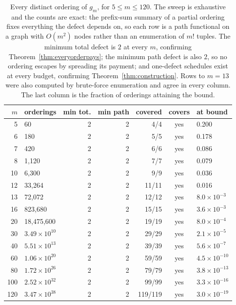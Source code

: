 \begin{table}[htbp]
\caption{Every distinct ordering of $g_{m}$, for $5\le m\le120$. The sweep is exhaustive
and the counts are exact: the prefix-sum summary of a partial ordering fixes everything the
defect depends on, so each row is a path functional on a graph with $O(m^{2})$ nodes rather
than an enumeration of $m!$ tuples. The minimum total defect is $2$ at every $m$, confirming
Theorem~\ref{thm:everyorderpays}; the minimum path defect is also $2$, so no ordering escapes
by spreading its payment; and one-defect schedules exist at every budget, confirming
Theorem~\ref{thm:construction}. Rows to $m=13$ were also computed by brute-force enumeration
and agree in every column. The last column is the fraction of orderings attaining the bound.
\NUM{}}
\label{tab:enum}
\centering
\footnotesize
\setlength{\tabcolsep}{3pt}
\begin{tabular}{@{}rlrrrcl@{}}
\toprule
$m$ & orderings & min tot. & min path & covered & covers & at bound \\
\midrule
5 & 60 & 2 & 2 & 4/4 & yes & 0.200 \\
6 & 180 & 2 & 2 & 5/5 & yes & 0.178 \\
7 & 420 & 2 & 2 & 6/6 & yes & 0.086 \\
8 & 1,120 & 2 & 2 & 7/7 & yes & 0.079 \\
10 & 6,300 & 2 & 2 & 9/9 & yes & 0.036 \\
12 & 33,264 & 2 & 2 & 11/11 & yes & 0.016 \\
13 & 72,072 & 2 & 2 & 12/12 & yes & $8.0\times10^{-3}$ \\
16 & 823,680 & 2 & 2 & 15/15 & yes & $3.6\times10^{-3}$ \\
20 & 18,475,600 & 2 & 2 & 19/19 & yes & $8.0\times10^{-4}$ \\
30 & $3.49\times10^{10}$ & 2 & 2 & 29/29 & yes & $2.1\times10^{-5}$ \\
40 & $5.51\times10^{13}$ & 2 & 2 & 39/39 & yes & $5.6\times10^{-7}$ \\
60 & $1.06\times10^{20}$ & 2 & 2 & 59/59 & yes & $4.5\times10^{-10}$ \\
80 & $1.72\times10^{26}$ & 2 & 2 & 79/79 & yes & $3.8\times10^{-13}$ \\
100 & $2.52\times10^{32}$ & 2 & 2 & 99/99 & yes & $3.3\times10^{-16}$ \\
120 & $3.47\times10^{38}$ & 2 & 2 & 119/119 & yes & $3.0\times10^{-19}$ \\
\bottomrule
\end{tabular}
\end{table}
